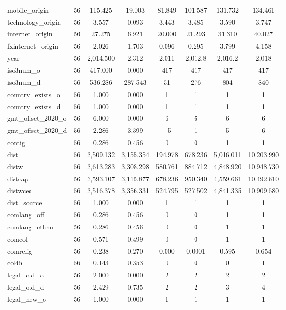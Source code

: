 \begin{table}[!htbp]
\begin{tabular}{@{\extracolsep{5pt}}lccccccc}
mobile\_origin & 56 & 115.425 & 19.003 & 81.849 & 101.587 & 131.732 & 134.461 \\ 
technology\_origin & 56 & 3.557 & 0.093 & 3.443 & 3.485 & 3.590 & 3.747 \\ 
internet\_origin & 56 & 27.275 & 6.921 & 20.000 & 21.293 & 31.310 & 40.027 \\ 
fxinternet\_origin & 56 & 2.026 & 1.703 & 0.096 & 0.295 & 3.799 & 4.158 \\ 
year & 56 & 2,014.500 & 2.312 & 2,011 & 2,012.8 & 2,016.2 & 2,018 \\ 
iso3num\_o & 56 & 417.000 & 0.000 & 417 & 417 & 417 & 417 \\ 
iso3num\_d & 56 & 536.286 & 287.543 & 31 & 276 & 804 & 840 \\ 
country\_exists\_o & 56 & 1.000 & 0.000 & 1 & 1 & 1 & 1 \\ 
country\_exists\_d & 56 & 1.000 & 0.000 & 1 & 1 & 1 & 1 \\ 
gmt\_offset\_2020\_o & 56 & 6.000 & 0.000 & 6 & 6 & 6 & 6 \\ 
gmt\_offset\_2020\_d & 56 & 2.286 & 3.399 & $-$5 & 1 & 5 & 6 \\ 
contig & 56 & 0.286 & 0.456 & 0 & 0 & 1 & 1 \\ 
dist & 56 & 3,509.132 & 3,155.354 & 194.978 & 678.236 & 5,016.011 & 10,203.990 \\ 
distw & 56 & 3,613.283 & 3,308.298 & 580.761 & 884.712 & 4,848.920 & 10,948.730 \\ 
distcap & 56 & 3,593.107 & 3,115.877 & 678.236 & 950.340 & 4,559.661 & 10,492.810 \\ 
distwces & 56 & 3,516.378 & 3,356.331 & 524.795 & 527.502 & 4,841.335 & 10,909.580 \\ 
dist\_source & 56 & 1.000 & 0.000 & 1 & 1 & 1 & 1 \\ 
comlang\_off & 56 & 0.286 & 0.456 & 0 & 0 & 1 & 1 \\ 
comlang\_ethno & 56 & 0.286 & 0.456 & 0 & 0 & 1 & 1 \\ 
comcol & 56 & 0.571 & 0.499 & 0 & 0 & 1 & 1 \\ 
comrelig & 56 & 0.238 & 0.270 & 0.000 & 0.0001 & 0.595 & 0.654 \\ 
col45 & 56 & 0.143 & 0.353 & 0 & 0 & 0 & 1 \\ 
legal\_old\_o & 56 & 2.000 & 0.000 & 2 & 2 & 2 & 2 \\ 
legal\_old\_d & 56 & 2.429 & 0.735 & 2 & 2 & 3 & 4 \\ 
legal\_new\_o & 56 & 1.000 & 0.000 & 1 & 1 & 1 & 1 \\ 

\end{tabular}
\end{table}
